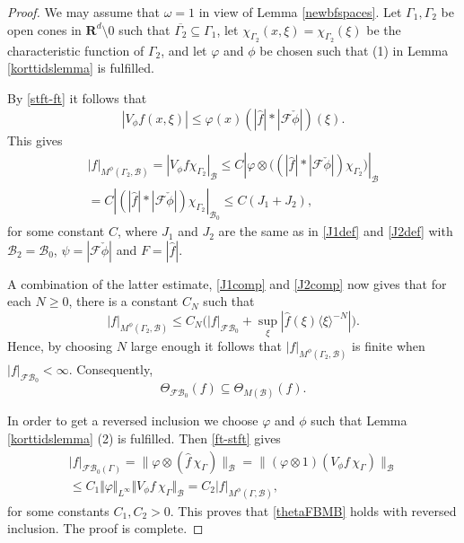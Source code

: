 \documentclass[12pt,a4paper,reqno]{amsart}
\numberwithin{equation}{section}
\numberwithin{thm}{section}
\theoremstyle{definition}
\theoremstyle{remark}
\begin{document}
\begin{proof}
We may assume that $\omega =1$ in view of Lemma \ref{newbfspaces}. Let $\Gamma _1,\Gamma _2$ be open cones in ${\mathbf R^{d}}{\setminus 0}$ such that $\overline {\Gamma _2}\subseteq \Gamma _1$, let $\chi _{\Gamma _2}(x,\xi )=\chi _{\Gamma _2}(\xi )$ be the characteristic function of $\Gamma _2$, and let ${\varphi}$ and $\phi$ be chosen such that (1) in Lemma \ref{korttidslemma} is fulfilled.

\par

By \eqref{stft-ft} it follows that
$$
|V_\phi f(x,\xi )| \le {\varphi} (x)(|\widehat f|*|\mathscr F\check \phi |)(\xi ).
$$
This gives
\begin{multline*}
|f|_{M^\phi (\Gamma _2,\mathscr B)} = |V_\phi f\chi _{\Gamma _2}|_{\mathscr B}
\le C | {\varphi} \otimes \big (  (|\widehat f|*|\mathscr F\check \phi |) \chi _{\Gamma _2}\big )|_{\mathscr B}
\\[1ex]
= C | (|\widehat f|*|\mathscr F\check \phi |) \chi _{\Gamma _2} |_{\mathscr B_0}
\le C(J_1+J_2),
\end{multline*}
for some constant $C$, where $J_1$ and $J_2$ are the same as in \eqref{J1def} and \eqref{J2def} with $\mathscr B_2=\mathscr B_0$, $\psi =|\mathscr F\check \phi |$ and $F=|\widehat f|$.

\par

A combination of the latter estimate, \eqref{J1comp} and \eqref{J2comp} now gives that for each $N\ge 0$, there is a constant $C_N$ such that
$$
|f|_{M^\phi (\Gamma _2,\mathscr B)}  \le C_N\Big ( |f|_{{\mathscr F\! \mathscr B}_0} +\sup _\xi |\widehat f(\xi ){\langle \xi\rangle} ^{-N}|\Big ).
$$
Hence, by choosing $N$ large enough it follows that $|f|_{M^\phi (\Gamma _2,\mathscr B)}$ is finite when $ |f|_{{\mathscr F\! \mathscr B}_0}<\infty$. Consequently,
\begin{equation}\label{thetaFBMB}
\Theta_{\mathscr{FB}_0} (f)\subseteq \Theta_{M(\mathscr B)} (f).
\end{equation}

\par

In order to get a reversed inclusion we choose ${\varphi}$ and $\phi$ such that Lemma \ref{korttidslemma} (2) is fulfilled. Then \eqref{ft-stft} gives
\begin{multline*}
|f|_{{\mathscr F\! \mathscr B} _0(\Gamma )} = \| {\varphi} \otimes (\widehat{f} \, \chi _\Gamma ) \| _{\mathscr B}
=\| ({\varphi} \otimes 1)(V_{\phi}f \, \chi _\Gamma ) \| _{\mathscr B} 
\\[1ex]
\le C_1{\Vert {\varphi}\Vert _{{L^\infty}}} {\Vert {V_{\phi}f \, \chi _\Gamma}\Vert _{{\mathscr B}}}
= C_2 |f|_{M^\phi (\Gamma ,\mathscr B)},
\end{multline*}
for some constants $C_1, C_2 >0.$ This proves that \eqref{thetaFBMB} holds with reversed inclusion. The proof is complete.
\end{proof}
\end{document}
